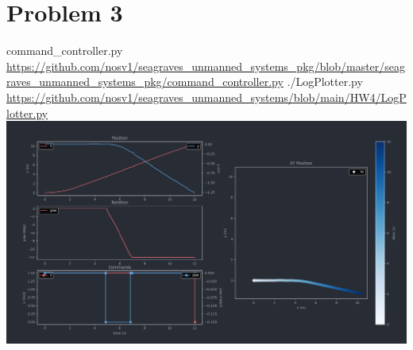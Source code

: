 \documentclass{article}
\begin{document}
    \section*{Problem 3}
        \raggedright
        command\_controller.py \break
        \url{https://github.com/nosv1/seagraves_unmanned_systems_pkg/blob/master/seagraves_unmanned_systems_pkg/command_controller.py} \break
        ./LogPlotter.py \break
        \url{https://github.com/nosv1/seagraves_unmanned_systems/blob/main/HW4/LogPlotter.py} \break
        \includegraphics[width=\linewidth]{Problem 3 Telemetry.png}
\end{document}
